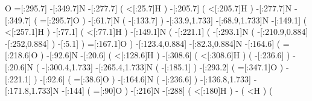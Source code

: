                    O%
          =[:295.7]%
          -[:349.7]N%
          -[:277.7]%
                      (
               <[:25.7]H%
                      )
          -[:205.7]%
                      (
              <[:205.7]H%
                      )
          -[:277.7]N%
          -[:349.7]%
                      (
              =[:295.7]O%
                      )
           -[:61.7]N%
                      (
              -[:133.7]%
                      )
     -[:33.9,1.733]%
     -[:68.9,1.733]N%
          -[:149.1]%
                      (
              <[:257.1]H%
                      )
           -[:77.1]%
                      (
               <[:77.1]H%
                      )
          -[:149.1]N%
                      (
              -[:221.1]%
                          (
                  -[:293.1]N%
                              (
                -[:210.9,0.884]%
                  -[:252,0.884]\phantom{N}%
                              )
                    -[:5.1]%
                          )
              =[:167.1]O%
                      )
    -[:123.4,0.884]%
     -[:82.3,0.884]N%
          -[:164.6]%
                      (
              =[:218.6]O%
                      )
           -[:92.6]N%
           -[:20.6]%
                      (
              <[:128.6]H%
                      )
          -[:308.6]%
                      (
              <[:308.6]H%
                      )
                      (
              -[:236.6]\phantom{N}%
                      )
           -[:20.6]N%
                      (
        -[:300.4,1.733]%
        -[:265.4,1.733]N%
                          (
                  -[:185.1]%
                          )
              -[:293.2]%
                          (
                  =[:347.1]O%
                          )
              -[:221.1]\phantom{N}%
                      )
           -[:92.6]%
                      (
               =[:38.6]O%
                      )
          -[:164.6]N%
                      (
              -[:236.6]%
                      )
    -[:136.8,1.733]%
    -[:171.8,1.733]N%
            -[:144]%
                      (
                 =[:90]O%
                      )
            -[:216]N%
            -[:288]%
                      (
                <[:180]H%
                      )
                  -%
                      (
                      <H%
                      )
                      (
